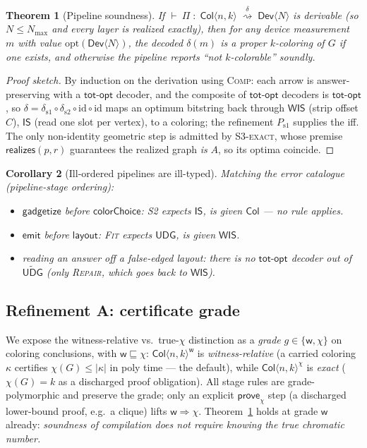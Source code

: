 \documentclass[11pt]{article}
\newtheorem{theorem}{Theorem}[section]
\newtheorem{corollary}[theorem]{Corollary}
\theoremstyle{definition}
\theoremstyle{remark}
\newcommand{\Col}{\mathsf{Col}}
\newcommand{\ISt}{\mathsf{IS}}
\newcommand{\WIS}{\mathsf{WIS}}
\newcommand{\tUDG}{\mathsf{UDG}}
\newcommand{\tUDGa}{\widetilde{\mathsf{UDG}}}
\newcommand{\Dev}{\mathsf{Dev}}
\newcommand{\Nmax}{N_{\max}}
\newcommand{\realizes}{\mathsf{realizes}}
\newcommand{\totopt}{\mathsf{tot\text{-}opt}}
\newcommand{\rn}[1]{\textsc{\footnotesize #1}}
\newcommand{\redto}[1]{\mathrel{\overset{\textstyle #1}{\rightsquigarrow}}}
\begin{document}
\begin{theorem}[Pipeline soundness]
\label{thm:sound}
If $\vdash\ \Pi \;:\; \Col\langle n,k\rangle \;\redto{\delta}\; \Dev\langle N\rangle$ is
derivable (so $N\le\Nmax$ and every layer is realized \emph{exactly}), then for any
device measurement $m$ with value $\mathrm{opt}(\Dev\langle N\rangle)$, the decoded
$\delta(m)$ is a proper $k$-coloring of $G$ if one exists, and otherwise the pipeline
reports ``not $k$-colorable'' soundly.
\end{theorem}

\begin{proof}[Proof sketch]
By induction on the derivation using \rn{Comp}: each arrow is answer-preserving with a
$\totopt$ decoder, and the composite of $\totopt$ decoders is $\totopt$, so
$\delta=\delta_{\mathrm{s1}}\circ\delta_{\mathrm{s2}}\circ\mathrm{id}\circ\mathrm{id}$
maps an optimum bitstring back through $\WIS$ (strip offset $C$), $\ISt$ (read one slot
per vertex), to a coloring; the refinement $P_{\mathrm{s1}}$ supplies the iff. The only
non-identity geometric step is admitted by \rn{S3-exact}, whose premise $\realizes(p,r)$
guarantees the realized graph \emph{is} $A$, so its optima coincide.
\end{proof}

\begin{corollary}[Ill-ordered pipelines are ill-typed]
\label{cor:order}
Matching the error catalogue (pipeline-stage ordering):
\begin{itemize}[leftmargin=1.4em,itemsep=1pt]
  \item $\mathsf{gadgetize}$ before $\mathsf{colorChoice}$: \rn{S2} expects $\ISt$, is
        given $\Col$ --- no rule applies.
  \item $\mathsf{emit}$ before $\mathsf{layout}$: \rn{Fit} expects $\tUDG$, is given
        $\WIS$.
  \item reading an answer off a false-edged layout: there is no $\totopt$ decoder out of
        $\tUDGa$ (only \rn{Repair}, which goes \emph{back} to $\WIS$).
\end{itemize}
\end{corollary}

\subsection{Refinement A: certificate grade}
\label{sec:grade}

We expose the witness-relative vs.\ true-$\chi$ distinction as a \emph{grade}
$g\in\{\mathsf{w},\chi\}$ on coloring conclusions, with $\mathsf{w}\sqsubseteq\chi$:
$\Col\langle n,k\rangle^{\mathsf{w}}$ is \emph{witness-relative} (a carried coloring
$\kappa$ certifies $\chi(G)\le|\kappa|$ in poly time --- the default), while $\Col\langle
n,k\rangle^{\chi}$ is \emph{exact} ($\chi(G)=k$ as a discharged proof obligation). All
stage rules are grade-polymorphic and preserve the grade; only an explicit
$\mathsf{prove}_\chi$ step (a discharged lower-bound proof, e.g.\ a clique) lifts
$\mathsf{w}\Rightarrow\chi$. Theorem~\ref{thm:sound} holds at grade $\mathsf{w}$ already:
\emph{soundness of compilation does not require knowing the true chromatic number.}
\end{document}
